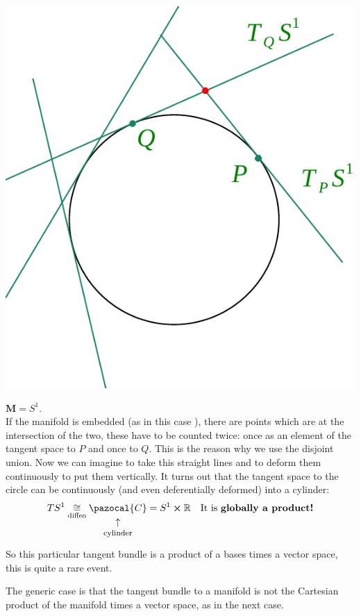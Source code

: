 \documentclass[../main.tex]{subfiles}
\begin{document}
\begin{marginfigure}[20mm]
	\includegraphics[width=1.2\linewidth]{images/Tangent_bundles.pdf}
	\caption[Tangent bundle]{}
\end{marginfigure} 
\begin{example}
$\mathbf{M}=S^1$.\\If the manifold is embedded (as in this case ), there are points which are at the intersection of the two, these have to be counted twice: once as an element of the tangent space to $P$ and once to $Q$. This is the reason why we use the disjoint union. Now we can imagine to take this straight lines and to deform them continuously to put them vertically. It turns out that the tangent space to the circle can be continuously (and even deferentially deformed) into a cylinder:
\[
TS^1\underset{\textrm{diffeo}}{\cong}\underset{\mathclap{\tikz \node {$\uparrow$} node [below=1ex] {\footnotesize cylinder};}}{\pazocal{C}}=S^1\cross \mathbb{R} \quad \textrm{It is \textbf{globally a product!}}
\]
So this particular tangent bundle is a product of a bases times a vector space, this is quite a rare event.
\end{example}
The generic case is that the tangent bundle to a manifold is not the Cartesian product of the manifold times a vector space, as in the next case.
\end{document}
